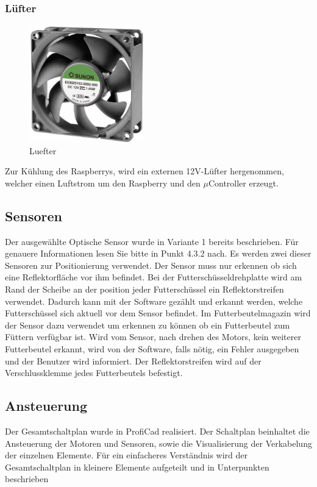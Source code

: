 \subsubsection{Lüfter}
\begin{figure}[H] 
\begin{center}

\includegraphics[width=5cm]{Bilder/Bauteile/Luefter}
\caption{Luefter}
\label{Luefter}

\end{center}
\end{figure}
Zur Kühlung des Raspberrys, wird ein externen 12V-Lüfter hergenommen, welcher einen Luftstrom um den Raspberry und den $\mu$Controller erzeugt.
\subsection{Sensoren}
Der ausgewählte Optische Sensor wurde in Variante 1 bereits beschrieben. Für genauere Informationen lesen Sie bitte in Punkt 4.3.2 nach.
Es werden zwei dieser Sensoren zur Positionierung verwendet. Der Sensor muss nur erkennen ob sich eine Reflektorfläche vor ihm befindet. Bei der Futterschüsseldrehplatte wird am Rand der Scheibe an der position jeder Futterschüssel ein Reflektorstreifen verwendet. Dadurch kann mit der Software gezählt und erkannt werden, welche Futterschüssel sich aktuell vor dem Sensor befindet. Im Futterbeutelmagazin wird der Sensor dazu verwendet um erkennen zu können ob ein Futterbeutel zum Füttern verfügbar ist. Wird vom Sensor, nach drehen des Motors, kein weiterer Futterbeutel erkannt, wird von der Software, falls nötig, ein Fehler ausgegeben und der Benutzer wird informiert. Der Reflektorstreifen wird auf der Verschlussklemme jedes Futterbeutels befestigt.
\subsection{Ansteuerung}
Der Gesamtschaltplan wurde in ProfiCad realisiert. Der Schaltplan beinhaltet die Ansteuerung der Motoren und Sensoren, sowie die Visualisierung der Verkabelung der einzelnen Elemente.
Für ein einfacheres Verständnis wird der Gesamtschaltplan in kleinere Elemente aufgeteilt und in Unterpunkten beschrieben
\newpage

